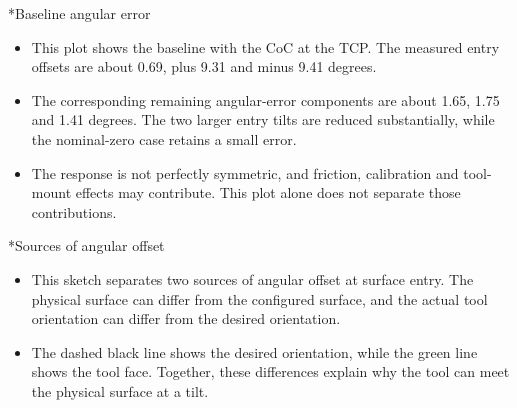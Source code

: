 \documentclass[12pt,a4paper]{article}
\makeatletter
\renewcommand\section{\@startsection{section}{1}{0pt}{14pt}{6pt}{\normalfont\Large\bfseries\color{navy}}}
\makeatother
\begin{document}
\section*{Baseline angular error}
\begin{itemize}
\item This plot shows the baseline with the CoC at the TCP. The measured entry offsets are about 0.69, plus 9.31 and minus 9.41 degrees.
\item The corresponding remaining angular-error components are about 1.65, 1.75 and 1.41 degrees. The two larger entry tilts are reduced substantially, while the nominal-zero case retains a small error.
\item The response is not perfectly symmetric, and friction, calibration and tool-mount effects may contribute. This plot alone does not separate those contributions.
\end{itemize}

\section*{Sources of angular offset}
\begin{itemize}
\item This sketch separates two sources of angular offset at surface entry. The physical surface can differ from the configured surface, and the actual tool orientation can differ from the desired orientation.
\item The dashed black line shows the desired orientation, while the green line shows the tool face. Together, these differences explain why the tool can meet the physical surface at a tilt.
\end{itemize}
\end{document}
